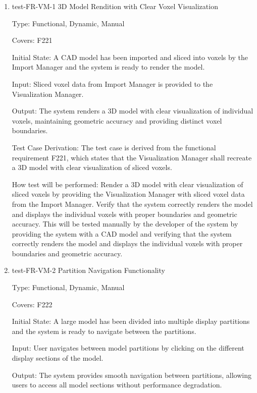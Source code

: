 \documentclass[12pt, titlepage]{article}
\begin{document}
\begin{enumerate}

\item{test-FR-VM-1 3D Model Rendition with Clear Voxel Visualization\\}

Type: Functional, Dynamic, Manual

Covers: F221
					
Initial State: A CAD model has been imported and sliced into voxels by the Import Manager and the system is ready to render the model.
					
Input: Sliced voxel data from Import Manager is provided to the Visualization Manager.
					
Output: The system renders a 3D model with clear visualization of individual voxels, maintaining geometric accuracy and providing distinct voxel boundaries.

Test Case Derivation: The test case is derived from the functional requirement F221, which states that the Visualization Manager shall recreate a 3D model with clear visualization of sliced voxels.
					
How test will be performed: Render a 3D model with clear visualization of sliced voxels by providing the Visualization Manager with sliced voxel data from the Import Manager. Verify that the system correctly renders the model and displays the individual voxels with proper boundaries and geometric accuracy. This will be tested manually by the developer of the system by providing the system with a CAD model and verifying that the system correctly renders the model and displays the individual voxels with proper boundaries and geometric accuracy. 

\item{test-FR-VM-2 Partition Navigation Functionality\\}

Type: Functional, Dynamic, Manual

Covers: F222
					
Initial State: A large model has been divided into multiple display partitions and the system is ready to navigate between the partitions.
					
Input: User navigates between model partitions by clicking on the different display sections of the model.
					
Output: The system provides smooth navigation between partitions, allowing users to access all model sections without performance degradation.


\end{enumerate}
\end{document}
